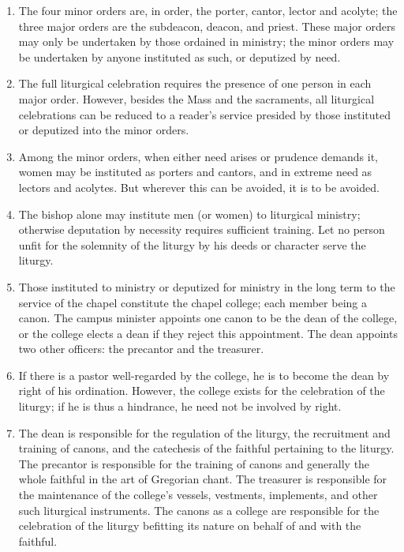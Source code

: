 		\begin{enumerate}
			\item The four minor orders are, in order, the porter, cantor, lector and acolyte; the three major orders are the subdeacon, deacon, and priest. These major orders may only be undertaken by those ordained in ministry; the minor orders may be undertaken by anyone instituted as such, or deputized by need.
		
			\item The full liturgical celebration requires the presence of one person in each major order. However, besides the Mass and the sacraments, all liturgical celebrations can be reduced to a reader's service presided by those instituted or deputized into the minor orders.
			
			\item Among the minor orders, when either need arises or prudence demands it, women may be instituted as porters and cantors, and in extreme need as lectors and acolytes. But wherever this can be avoided, it is to be avoided.
			
			\item The bishop alone may institute men (or women) to liturgical ministry; otherwise deputation by necessity requires sufficient training. Let no person unfit for the solemnity of the liturgy by his deeds or character serve the liturgy.
			
			
		
		
			\item Those instituted to ministry or deputized for ministry in the long term to the service of the chapel constitute the chapel college; each member being a canon. The campus minister appoints one canon to be the dean of the college, or the college elects a dean if they reject this appointment. The dean appoints two other officers: the precantor and the treasurer.
			
			\item If there is a pastor well-regarded by the college, he is to become the dean by right of his ordination. However, the college exists for the celebration of the liturgy; if he is thus a hindrance, he need not be involved by right.
			
			\item The dean is responsible for the regulation of the liturgy, the recruitment and training of canons, and the catechesis of the faithful pertaining to the liturgy. The precantor is responsible for the training of canons and generally the whole faithful in the art of Gregorian chant. The treasurer is responsible for the maintenance of the college's vessels, vestments, implements, and other such liturgical instruments. The canons as a college are responsible for the celebration of the liturgy befitting its nature on behalf of and with the faithful.
			

\end{enumerate}

